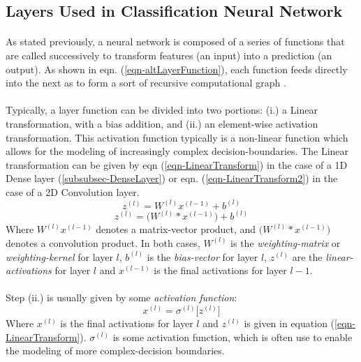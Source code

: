 \documentclass[12pt,letterpaper]{article}
\begin{document}

\subsection{Layers Used in Classification Neural Network}
\label{subsec-Layers}

\paragraph*{}As stated previously, a neural network is composed of a series of functions that are called successively to transform features (an input) into a prediction (an output). As shown in eqn. (\ref{eqn-altLayerFunction}), each function feeds directly into the next as to form a sort of recursive computational graph \cite{Goodfellow}. 

\paragraph*{}Typically, a layer function can be divided into two portions: (i.) a Linear transformation, with a bias addition, and (ii.) an element-wise activation transformation. This activation function typically is a non-linear function which allows for the modeling of increasingly complex decision-boundaries. The Linear transformation can be given by eqn (\ref{eqn-LinearTransform}) in the case of a 1D Dense layer (\ref{subsubsec-DenseLayer}) or eqn. (\ref{eqn-LinearTransform2}) in the case of a 2D Convolution layer.
\begin{equation}
\label{eqn-LinearTransform}
z^{(l)} = W^{(l)} x^{(l-1)} + b^{(l)}
\end{equation}
\begin{equation}
\label{eqn-LinearTransform2}
z^{(l)} = \big(W^{(l)} * x^{(l-1)}\big) + b^{(l)}
\end{equation} 
Where $W^{(l)} x^{(l-1)}$ denotes a matrix-vector product, and $\big(W^{(l)} * x^{(l-1)}\big)$ denotes a convolution product. In both cases, $W^{(l)}$ is the \textit{weighting-matrix} or \textit{weighting-kernel} for layer $l$, $b^{(l)}$ is the \textit{bias-vector} for layer $l$, $z^{(l)}$ are the \textit{linear-activations} for layer $l$ and $x^{(l-1)}$ is the final activations for layer $l-1$.

\paragraph*{}Step (ii.) is usually given by some \textit{activation function}:
\begin{equation}
\label{eqn-elementActivation}
x^{(l)} = \sigma^{(l)} \big[ z^{(l)} \big]
\end{equation}
Where $x^{(l)}$ is the final activations for layer $l$ and $z^{(l)}$ is given in equation (\ref{eqn-LinearTransform}). $\sigma^{(l)}$ is some activation function, which is often use to enable the modeling of more complex-decision boundaries. 
\end{document}
